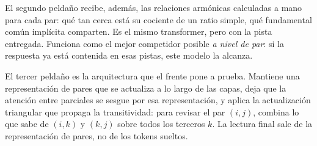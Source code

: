 \documentclass[11pt]{article}
\begin{document}
El segundo peldaño recibe, además, las relaciones armónicas calculadas a mano para cada par: qué tan cerca está su cociente de un ratio simple, qué fundamental común implícita comparten. Es el mismo transformer, pero con la pista entregada. Funciona como el mejor competidor posible \emph{a nivel de par}: si la respuesta ya está contenida en esas pistas, este modelo la alcanza.

\begin{figure}[H]
\centering
{}
\end{figure}

El tercer peldaño es la arquitectura que el frente pone a prueba. Mantiene una representación de pares que se actualiza a lo largo de las capas, deja que la atención entre parciales se sesgue por esa representación, y aplica la actualización triangular que propaga la transitividad: para revisar el par $(i,j)$, combina lo que sabe de $(i,k)$ y $(k,j)$ sobre todos los terceros $k$. La lectura final sale de la representación de pares, no de los tokens sueltos.
\end{document}
